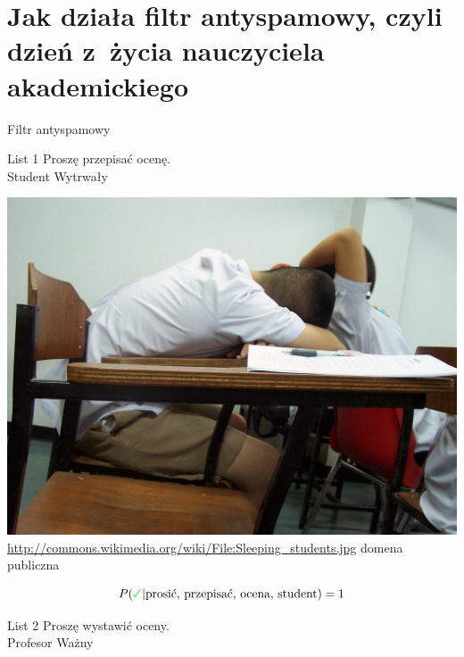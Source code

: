 \documentclass{beamer}
\newcommand{\cmark}{\textcolor{green!80!black!50}{\text{\ding{51}}}}
\begin{document}
\part{Jak działa filtr antyspamowy, czyli dzień z~życia nauczyciela akademickiego}
\frame{\partpage}
\begin{frame}{Filtr antyspamowy}
{
	\begin{minipage}{.50\textwidth}
\begin{block}{List 1}
Proszę przepisać ocenę.\\
Student Wytrwały
\end{block}
\end{minipage}
\hfill
\begin{minipage}{.45\textwidth}
\includegraphics[width=\textwidth]{bayes/Sleeping_students.jpg}\\
{\tiny \url{http://commons.wikimedia.org/wiki/File:Sleeping_students.jpg} domena publiczna}
\end{minipage}
\[ P(\cmark | \text{prosić, przepisać, ocena, student})=1 \]
}
{
	\begin{minipage}{.50\textwidth}
\begin{block}{List 2}
Proszę wystawić oceny.\\
Profesor Ważny
\end{block}
\end{minipage}
\hfill
\begin{minipage}{.45\textwidth}

\end{minipage}}
\end{frame}
\end{document}
